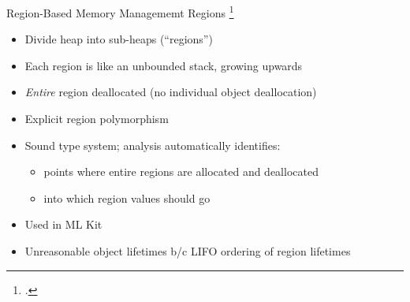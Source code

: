 \documentclass[aspectratio=169]{beamer}
\begin{document}
\begin{frame}{Region-Based Memory Managememt}
    Regions \footcite{tofte_region-based_1997}
    \begin{itemize}
        \item Divide heap into sub-heaps (``regions'')
        \item Each region is like an unbounded stack, growing upwards
        \item \emph{Entire} region deallocated (no individual object deallocation)
        \item Explicit region polymorphism %
        \item Sound type system; analysis automatically identifies:
            \begin{itemize}
                \item points where entire regions are allocated and deallocated
                \item into which region values should go
            \end{itemize}
        \item Used in ML Kit
        \item Unreasonable object lifetimes b/c LIFO ordering of region lifetimes %
    \end{itemize}
    \vspace{0.1in}
\end{frame}
\end{document}
